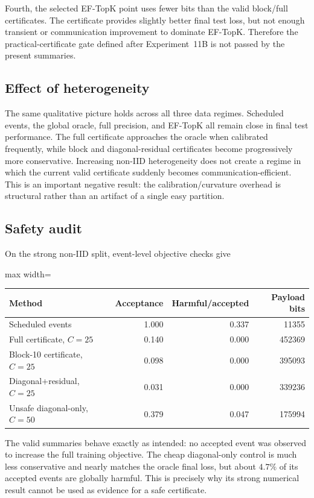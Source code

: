 Fourth, the selected EF-TopK point uses fewer bits than the valid block/full certificates. The certificate provides slightly better final test loss, but not enough transient or communication improvement to dominate EF-TopK. Therefore the practical-certificate gate defined after Experiment~11B is not passed by the present summaries.

\subsection{Effect of heterogeneity}

The same qualitative picture holds across all three data regimes. Scheduled events, the global oracle, full precision, and EF-TopK all remain close in final test performance. The full certificate approaches the oracle when calibrated frequently, while block and diagonal-residual certificates become progressively more conservative. Increasing non-IID heterogeneity does not create a regime in which the current valid certificate suddenly becomes communication-efficient. This is an important negative result: the calibration/curvature overhead is structural rather than an artifact of a single easy partition.

\subsection{Safety audit}

On the strong non-IID split, event-level objective checks give
\begin{center}
\begin{adjustbox}{max width=\textwidth}
\begin{tabular}{lrrr}
\toprule
Method & Acceptance & Harmful/accepted & Payload bits\\
\midrule
Scheduled events & 1.000 & 0.337 & 11355\\
Full certificate, $C=25$ & 0.140 & 0.000 & 452369\\
Block-10 certificate, $C=25$ & 0.098 & 0.000 & 395093\\
Diagonal+residual, $C=25$ & 0.031 & 0.000 & 339236\\
Unsafe diagonal-only, $C=50$ & 0.379 & 0.047 & 175994\\
\bottomrule
\end{tabular}
\end{adjustbox}
\end{center}
The valid summaries behave exactly as intended: no accepted event was observed to increase the full training objective. The cheap diagonal-only control is much less conservative and nearly matches the oracle final loss, but about $4.7\%$ of its accepted events are globally harmful. This is precisely why its strong numerical result cannot be used as evidence for a safe certificate.

